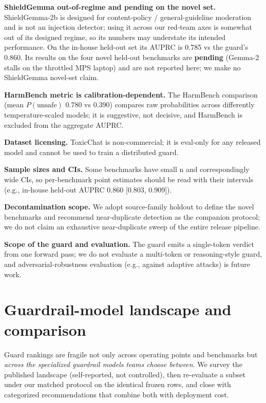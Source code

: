 \documentclass[sigconf,nonacm]{acmart}
\begin{document}
\textbf{ShieldGemma out-of-regime and pending on the novel set.} ShieldGemma-2b is designed for content-policy / general-guideline moderation and is not an injection detector; using it across our red-team axes is somewhat out of its designed regime, so its numbers may understate its intended performance. On the in-house held-out set its AUPRC is 0.785 vs the guard's 0.860. Its results on the four novel held-out benchmarks are \textbf{pending} (Gemma-2 stalls on the throttled MPS laptop) and are not reported here; we make no ShieldGemma novel-set claim.

\textbf{HarmBench metric is calibration-dependent.} The HarmBench comparison (mean $P(\text{unsafe})$ 0.780 vs 0.390) compares raw probabilities across differently temperature-scaled models; it is suggestive, not decisive, and HarmBench is excluded from the aggregate AUPRC.

\textbf{Dataset licensing.} ToxicChat is non-commercial; it is eval-only for any released model and cannot be used to train a distributed guard.

\textbf{Sample sizes and CIs.} Some benchmarks have small n and correspondingly wide CIs, so per-benchmark point estimates should be read with their intervals (e.g., in-house held-out AUPRC 0.860 [0.803, 0.909]).

\textbf{Decontamination scope.} We adopt source-family holdout to define the novel benchmarks and recommend near-duplicate detection as the companion protocol; we do not claim an exhaustive near-duplicate sweep of the entire release pipeline.

\textbf{Scope of the guard and evaluation.} The guard emits a single-token verdict from one forward pass; we do not evaluate a multi-token or reasoning-style guard, and adversarial-robustness evaluation (e.g., against adaptive attacks) is future work.

\section{Guardrail-model landscape and comparison}
\label{sec:guardrails}

Guard rankings are fragile not only across operating points and benchmarks but \emph{across the specialized guardrail models teams choose between}. We survey the published landscape (self-reported, not controlled), then re-evaluate a subset under our matched protocol on the identical frozen rows, and close with categorized recommendations that combine both with deployment cost.
\end{document}
